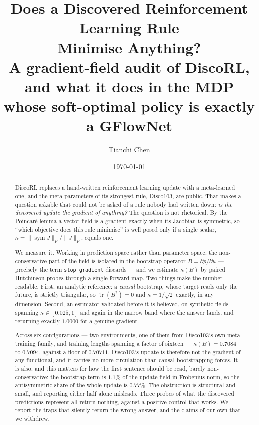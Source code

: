 \documentclass[11pt]{article}
\title{\bf Does a Discovered Reinforcement Learning Rule\\ Minimise Anything?\\[2mm]
\large A gradient-field audit of DiscoRL, and what it does in the MDP\\
whose soft-optimal policy is exactly a GFlowNet}
\author{Tianchi Chen}
\date{\today}
\theoremstyle{remark}
\newcommand{\sym}{\operatorname{sym}}
\newcommand{\tr}{\operatorname{tr}}
\begin{document}
\maketitle

\begin{abstract}
DiscoRL replaces a hand-written reinforcement learning update with a
meta-learned one, and the meta-parameters of its strongest rule, Disco103, are
public. That makes a question askable that could not be asked of a rule nobody
had written down: \emph{is the discovered update the gradient of anything?} The
question is not rhetorical. By the Poincar\'e lemma a vector field is a gradient
exactly when its Jacobian is symmetric, so ``which objective does this rule
minimise'' is well posed only if a single scalar, $\kappa = \lVert \sym
J\rVert_F / \lVert J \rVert_F$, equals one.

We measure it. Working in prediction space rather than parameter space, the
non-conservative part of the field is isolated in the bootstrap operator
$B = \partial \hat p / \partial u$ --- precisely the term \texttt{stop\_gradient}
discards --- and we estimate $\kappa(B)$ by paired Hutchinson probes through a
single forward map. Two things make the number readable. First, an analytic
reference: a \emph{causal} bootstrap, whose target reads only the future, is
strictly triangular, so $\tr(B^2) = 0$ and $\kappa = 1/\sqrt 2$ exactly, in any
dimension. Second, an estimator validated before it is believed, on synthetic
fields spanning $\kappa \in [0.025, 1]$ and again in the narrow band where the
answer lands, and returning exactly $1.0000$ for a genuine gradient.

Across six configurations --- two environments, one of them from Disco103's own
meta-training family, and training lengths spanning a factor of sixteen ---
$\kappa(B) = 0.7084$ to $0.7094$, against a floor of $0.70711$. Disco103's update
is therefore not the gradient of any functional, and it carries no more
circulation than causal bootstrapping forces. It is also, and this matters for
how the first sentence should be read, barely non-conservative: the bootstrap
term is $1.1\%$ of the update field in Frobenius norm, so the antisymmetric
share of the whole update is $0.77\%$. The obstruction is structural and small,
and reporting either half alone misleads. Three probes of what the
discovered predictions represent all return nothing, against a positive control
that works. We report the traps that silently return the wrong answer, and the
claims of our own that we withdrew.


\end{abstract}
\end{document}

